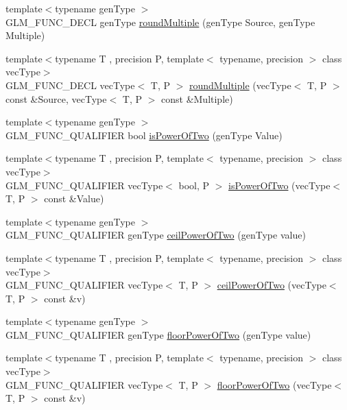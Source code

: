 \begin{DoxyCompactItemize}
\item 
{\footnotesize template$<$typename gen\+Type $>$ }\\G\+L\+M\+\_\+\+F\+U\+N\+C\+\_\+\+D\+E\+C\+L gen\+Type \hyperlink{group__gtc__round_ga6739d1de04b2cea7c78675b365644bce}{round\+Multiple} (gen\+Type Source, gen\+Type Multiple)
\item 
{\footnotesize template$<$typename T , precision P, template$<$ typename, precision $>$ class vec\+Type$>$ }\\G\+L\+M\+\_\+\+F\+U\+N\+C\+\_\+\+D\+E\+C\+L vec\+Type$<$ T, P $>$ \hyperlink{group__gtc__round_ga10a8ab7b254257b607b6a3fc68c3e661}{round\+Multiple} (vec\+Type$<$ T, P $>$ const \&Source, vec\+Type$<$ T, P $>$ const \&Multiple)
\item 
{\footnotesize template$<$typename gen\+Type $>$ }\\G\+L\+M\+\_\+\+F\+U\+N\+C\+\_\+\+Q\+U\+A\+L\+I\+F\+I\+E\+R bool \hyperlink{namespaceglm_a2e60d24d864637d3ebd62e6fa4941613}{is\+Power\+Of\+Two} (gen\+Type Value)
\item 
{\footnotesize template$<$typename T , precision P, template$<$ typename, precision $>$ class vec\+Type$>$ }\\G\+L\+M\+\_\+\+F\+U\+N\+C\+\_\+\+Q\+U\+A\+L\+I\+F\+I\+E\+R vec\+Type$<$ bool, P $>$ \hyperlink{group__gtc__round_gad454e4c8d8cd73ddc7de855f733a1465}{is\+Power\+Of\+Two} (vec\+Type$<$ T, P $>$ const \&Value)
\item 
{\footnotesize template$<$typename gen\+Type $>$ }\\G\+L\+M\+\_\+\+F\+U\+N\+C\+\_\+\+Q\+U\+A\+L\+I\+F\+I\+E\+R gen\+Type \hyperlink{namespaceglm_a15ad0f1b70561471f34bc2e43469424e}{ceil\+Power\+Of\+Two} (gen\+Type value)
\item 
{\footnotesize template$<$typename T , precision P, template$<$ typename, precision $>$ class vec\+Type$>$ }\\G\+L\+M\+\_\+\+F\+U\+N\+C\+\_\+\+Q\+U\+A\+L\+I\+F\+I\+E\+R vec\+Type$<$ T, P $>$ \hyperlink{group__gtc__round_ga76ec9b214ea1376fe09a903e34bab847}{ceil\+Power\+Of\+Two} (vec\+Type$<$ T, P $>$ const \&v)
\item 
{\footnotesize template$<$typename gen\+Type $>$ }\\G\+L\+M\+\_\+\+F\+U\+N\+C\+\_\+\+Q\+U\+A\+L\+I\+F\+I\+E\+R gen\+Type \hyperlink{namespaceglm_ac1385510b859757901e927c43bf4f329}{floor\+Power\+Of\+Two} (gen\+Type value)
\item 
{\footnotesize template$<$typename T , precision P, template$<$ typename, precision $>$ class vec\+Type$>$ }\\G\+L\+M\+\_\+\+F\+U\+N\+C\+\_\+\+Q\+U\+A\+L\+I\+F\+I\+E\+R vec\+Type$<$ T, P $>$ \hyperlink{group__gtc__round_ga6a5a8f6dd1b2f755e4572bd039062c37}{floor\+Power\+Of\+Two} (vec\+Type$<$ T, P $>$ const \&v)

\end{DoxyCompactItemize}
